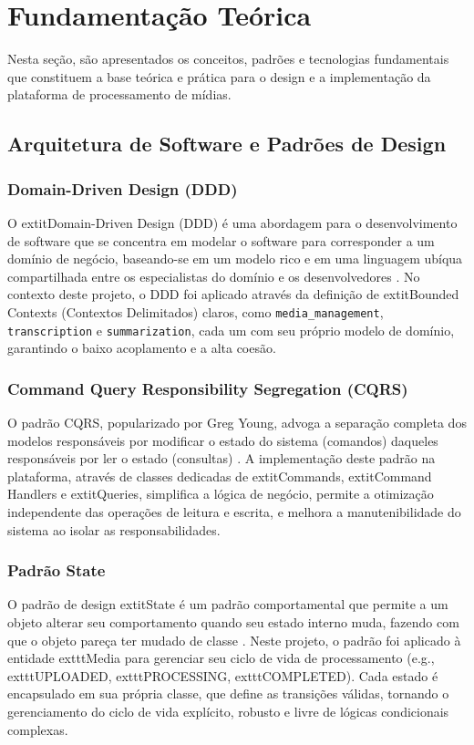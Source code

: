 \section{Fundamentação Teórica}
\label{sec:fundamentacao}

Nesta seção, são apresentados os conceitos, padrões e tecnologias fundamentais que constituem a base teórica e prática para o design e a implementação da plataforma de processamento de mídias.

\subsection{Arquitetura de Software e Padrões de Design}

\subsubsection{Domain-Driven Design (DDD)}
O 	extit{Domain-Driven Design} (DDD) é uma abordagem para o desenvolvimento de software que se concentra em modelar o software para corresponder a um domínio de negócio, baseando-se em um modelo rico e em uma linguagem ubíqua compartilhada entre os especialistas do domínio e os desenvolvedores \cite{evans2004domain}. No contexto deste projeto, o DDD foi aplicado através da definição de 	extit{Bounded Contexts} (Contextos Delimitados) claros, como \texttt{media\_management}, \texttt{transcription} e \texttt{summarization}, cada um com seu próprio modelo de domínio, garantindo o baixo acoplamento e a alta coesão.

\subsubsection{Command Query Responsibility Segregation (CQRS)}
O padrão CQRS, popularizado por Greg Young, advoga a separação completa dos modelos responsáveis por modificar o estado do sistema (comandos) daqueles responsáveis por ler o estado (consultas) \cite{young2010cqrs}. A implementação deste padrão na plataforma, através de classes dedicadas de 	extit{Commands}, 	extit{Command Handlers} e 	extit{Queries}, simplifica a lógica de negócio, permite a otimização independente das operações de leitura e escrita, e melhora a manutenibilidade do sistema ao isolar as responsabilidades.

\subsubsection{Padrão State}
O padrão de design 	extit{State} é um padrão comportamental que permite a um objeto alterar seu comportamento quando seu estado interno muda, fazendo com que o objeto pareça ter mudado de classe \cite{gamma1995design}. Neste projeto, o padrão foi aplicado à entidade 	exttt{Media} para gerenciar seu ciclo de vida de processamento (e.g., 	exttt{UPLOADED}, 	exttt{PROCESSING}, 	exttt{COMPLETED}). Cada estado é encapsulado em sua própria classe, que define as transições válidas, tornando o gerenciamento do ciclo de vida explícito, robusto e livre de lógicas condicionais complexas.

